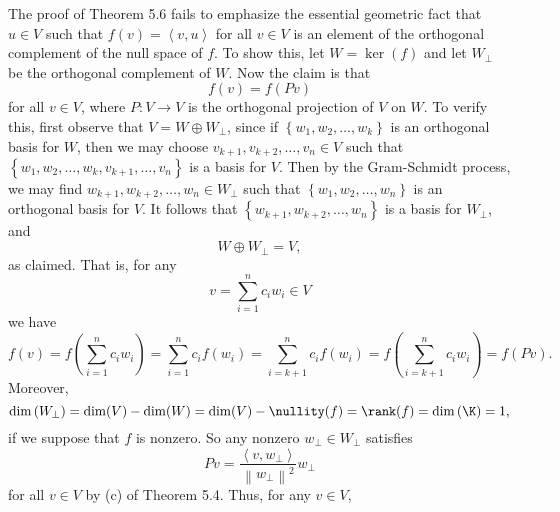 \documentclass[linearalgebraII]{subfiles}
\begin{document}
    \begin{remark}
        The proof of Theorem 5.6 fails to emphasize the essential geometric fact that $u\in V$ such that $f(v) = \left\langle v, u\right\rangle$ for all $v\in V$ is an element of the orthogonal complement of the null space of $f$. To show this, let $W = \ker(f)$ and let $W_\perp$ be the orthogonal complement of $W$. Now the claim is that
        \begin{equation*}
            f(v) = f\left( Pv \right)
        \end{equation*}
        for all $v\in V$, where $P:V\to V$ is the orthogonal projection of $V$ on $W$. To verify this, first observe that $V = W\oplus W_\perp$, since if $\left\lbrace w_1,w_2,\ldots,w_k \right\rbrace$ is an orthogonal basis for $W$, then we may choose $v_{k+1}, v_{k+2}, \ldots, v_n\in V$ such that $\left\lbrace w_1,w_2,\ldots,w_k, v_{k+1}, \ldots, v_n \right\rbrace$ is a basis for $V$. Then by the Gram-Schmidt process, we may find $w_{k+1}, w_{k+2}, \ldots, w_n\in W_\perp$ such that $\left\lbrace w_1,w_2,\ldots,w_n \right\rbrace$ is an orthogonal basis for $V$. It follows that $\left\lbrace w_{k+1}, w_{k+2}, \ldots, w_{n} \right\rbrace$ is a basis for $W_\perp$, and
        \begin{equation*}
            W\oplus W_\perp = V,
        \end{equation*}
        as claimed. That is, for any
        \begin{equation*}
            v = \sum^{n}_{i=1} c_iw_i\in V
        \end{equation*}
        we have
        \begin{equation*}
            f\left( v \right) = f\left( \sum^{n}_{i=1} c_iw_i \right) = \sum^{n}_{i=1} c_if\left( w_i \right) = \sum^{n}_{i=k+1} c_if\left( w_i \right) = f\left( \sum^{n}_{i=k+1} c_iw_i \right) = f\left( Pv \right).
        \end{equation*}
        Moreover, 
        \begin{equation*}
            \dim\left( W_\perp \right) = \dim(V)-\dim(W) = \dim(V)-\nullity(f) = \rank(f) = \dim\left( \K \right) = 1,
        \end{equation*}
        if we suppose that $f$ is nonzero. So any nonzero $w_\perp\in W_\perp$ satisfies 
        \begin{equation*}
            Pv = \frac{\left\langle v, w_\perp\right\rangle }{\left\lVert w_\perp\right\rVert ^2}w_\perp
        \end{equation*}
        for all $v\in V$ by (c) of Theorem 5.4. Thus, for any $v\in V$,

\end{remark}
\end{document}
